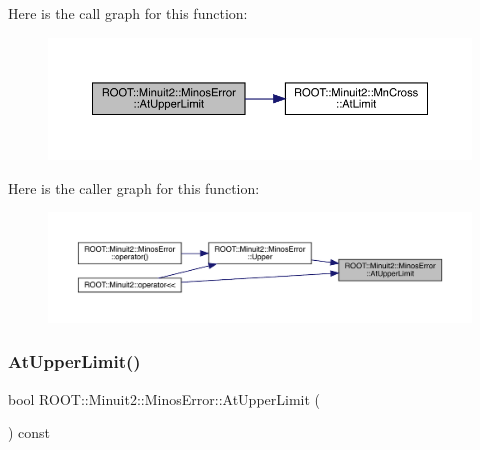 Here is the call graph for this function\+:
\nopagebreak
\begin{figure}[H]
\begin{center}
\leavevmode
\includegraphics[width=350pt]{d2/dd1/classROOT_1_1Minuit2_1_1MinosError_a6c8a60e5b855f9d7164f441ea69c75eb_cgraph}
\end{center}
\end{figure}
Here is the caller graph for this function\+:\nopagebreak
\begin{figure}[H]
\begin{center}
\leavevmode
\includegraphics[width=350pt]{d2/dd1/classROOT_1_1Minuit2_1_1MinosError_a6c8a60e5b855f9d7164f441ea69c75eb_icgraph}
\end{center}
\end{figure}
\mbox{\label{classROOT_1_1Minuit2_1_1MinosError_a6c8a60e5b855f9d7164f441ea69c75eb}} 
\subsubsection{\texorpdfstring{AtUpperLimit()}{AtUpperLimit()}\hspace{0.1cm}{\footnotesize\ttfamily [2/2]}}
{\footnotesize\ttfamily bool R\+O\+O\+T\+::\+Minuit2\+::\+Minos\+Error\+::\+At\+Upper\+Limit (\begin{DoxyParamCaption}{ }\end{DoxyParamCaption}) const\hspace{0.3cm}{\ttfamily [inline]}}

